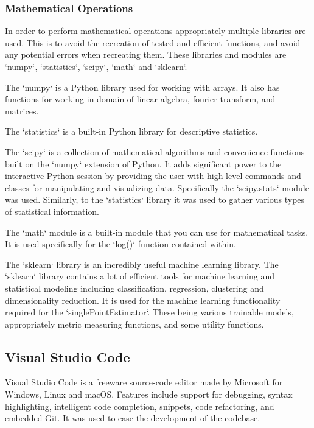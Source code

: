 \subsubsection{Mathematical Operations}

In order to perform mathematical operations appropriately multiple libraries are used. This is to avoid the recreation of tested and efficient functions, and avoid any potential errors when recreating them. These libraries and modules are `numpy`, `statistics`, `scipy`, `math` and `sklearn`.

The `numpy` is a Python library used for working with arrays. It also has functions for working in domain of linear algebra, fourier transform, and matrices.

The `statistics` is a built-in Python library for descriptive statistics.

The `scipy` is a collection of mathematical algorithms and convenience functions built on the `numpy` extension of Python. It adds significant power to the interactive Python session by providing the user with high-level commands and classes for manipulating and visualizing data. Specifically the `scipy.stats` module was used. Similarly, to the `statistics` library it was used to gather various types of statistical information.

The `math` module is a built-in module that you can use for mathematical tasks. It is used specifically for the `log()` function contained within.

The `sklearn` library is an incredibly useful machine learning library. The `sklearn` library contains a lot of efficient tools for machine learning and statistical modeling including classification, regression, clustering and dimensionality reduction. It is used for the machine learning functionality required for the `singlePointEstimator`. These being various trainable models, appropriately metric measuring functions, and some utility functions.

\subsection{Visual Studio Code}

Visual Studio Code is a freeware source-code editor made by Microsoft for Windows, Linux and macOS. Features include support for debugging, syntax highlighting, intelligent code completion, snippets, code refactoring, and embedded Git. It was used to ease the development of the codebase.

